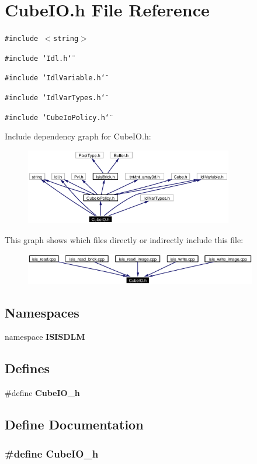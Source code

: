 \section{Cube\-IO.h File Reference}
\label{CubeIO_8h}
{\tt \#include $<$string$>$}\par
{\tt \#include \char`\"{}Idl.h\char`\"{}}\par
{\tt \#include \char`\"{}Idl\-Variable.h\char`\"{}}\par
{\tt \#include \char`\"{}Idl\-Var\-Types.h\char`\"{}}\par
{\tt \#include \char`\"{}Cube\-Io\-Policy.h\char`\"{}}\par


Include dependency graph for Cube\-IO.h:\begin{figure}[H]
\begin{center}
\leavevmode
\includegraphics[width=257pt]{CubeIO_8h__incl}
\end{center}
\end{figure}


This graph shows which files directly or indirectly include this file:\begin{figure}[H]
\begin{center}
\leavevmode
\includegraphics[width=288pt]{CubeIO_8h__dep__incl}
\end{center}
\end{figure}
\subsection*{Namespaces}
\begin{CompactItemize}
\item 
namespace {\bf ISISDLM}
\end{CompactItemize}
\subsection*{Defines}
\begin{CompactItemize}
\item 
\#define {\bf Cube\-IO\_\-h}
\end{CompactItemize}


\subsection{Define Documentation}
\subsubsection{\setlength{\rightskip}{0pt plus 5cm}\#define Cube\-IO\_\-h}\label{CubeIO_8h_a0}


